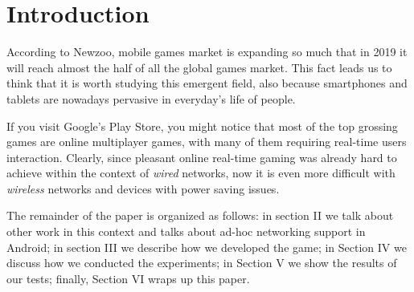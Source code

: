 \section{Introduction}
According to Newzoo, mobile games market is expanding so much that in 2019
it will reach almost the half of all the global games
market\cite{bib:newzoo}. This fact leads us to think that it is worth studying
this emergent field, also because smartphones and tablets are nowadays
pervasive in everyday's life of people.

If you visit Google's Play Store, you might notice that most of the top
grossing games are online multiplayer games, with many of them requiring
real-time users interaction. Clearly, since pleasant online real-time gaming
was already hard to achieve within the context of \textit{wired} networks, now
it is even more difficult with \textit{wireless} networks and devices with
power saving issues.

The remainder of the paper is organized as follows: in section II we talk about
other work in this context and talks about ad-hoc networking support in Android;
in section III we describe how we developed the game; in Section IV we discuss
how we conducted the experiments; in Section V we show the results of our tests;
finally, Section VI wraps up this paper.
